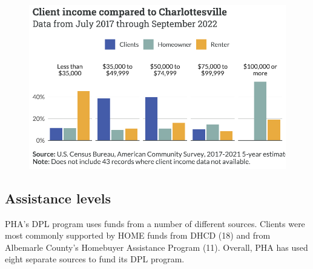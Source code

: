 \documentclass[
  letterpaper,
  DIV=11,
  numbers=noendperiod]{scrartcl}
\begin{document}
\begin{figure}[H]

{\centering \includegraphics{piedmont_files/figure-pdf/income-compare-1.pdf}

}

\end{figure}

\hypertarget{assistance-levels}{%
\subsection{Assistance levels}\label{assistance-levels}}

PHA's DPL program uses funds from a number of different sources. Clients
were most commonly supported by HOME funds from DHCD (18) and from
Albemarle County's Homebuyer Assistance Program (11). Overall, PHA has
used eight separate sources to fund its DPL program.
\end{document}
